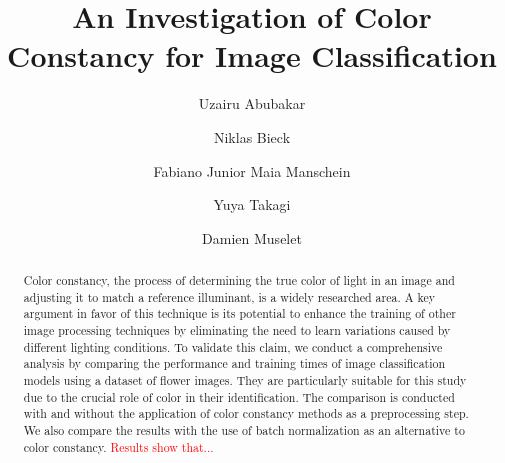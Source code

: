 \documentclass[runningheads]{llncs}
\begin{document}
\title{An Investigation of Color Constancy for Image Classification}

\author{
    Uzairu Abubakar \and
    Niklas Bieck \and
    Fabiano Junior Maia Manschein \and
    Yuya Takagi \and
    Damien Muselet
}




\maketitle

\begin{abstract}
    Color constancy, the process of determining the true color of light in an image
    and adjusting it to match a reference illuminant, is a widely researched area.
    A key argument in favor of this technique is its potential to enhance the training
    of other image processing techniques by eliminating the need to learn variations
    caused by different lighting conditions. To validate this claim, we conduct a
    comprehensive analysis by comparing the performance and training times of image
    classification models using a dataset of flower images. They are particularly
    suitable for this study due to the crucial role of color in their identification.
    The comparison is conducted with and without the application of color constancy
    methods as a preprocessing step. We also compare the results with the use of batch
    normalization as an alternative to color constancy. \textcolor{red}{Results show that...}
\end{abstract}



\end{document}
